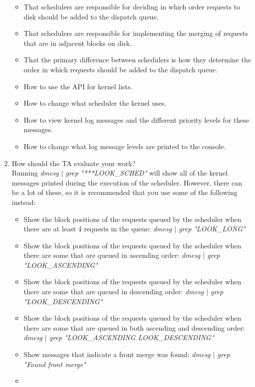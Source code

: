 \documentclass[onecolumn,draftclsnofoot, 10pt, compsoc]{IEEEtran}
\begin{document}
\begin{enumerate}
			\begin{itemize}
				\item
					That schedulers are responsible for deciding in which order requests to disk should be added to the dispatch queue.
				\item
					That schedulers are responsible for implementing the merging of requests that are in adjacent blocks on disk.
				\item 
					That the primary difference between schedulers is how they determine the order in which requests should be added to the dispatch queue.
				\item
					How to use the API for kernel lists.
				\item
					How to change what scheduler the kernel uses.
				\item
					How to view kernel log messages and the different priority levels for these messages.
				\item
					How to change what log message levels are printed to the console.
			\end{itemize}
		\item How should the TA evaluate your work? \\
			Running \textit{dmesg $|$ grep "***LOOK\_SCHED"} will show all of the kernel messages printed during the execution of the scheduler.
			However, there can be a lot of these, so it is recommended that you use some of the following instead:
			\begin{itemize}
				\item
					Show the block positions of the requests queued by the scheduler when there are at least 4 requests in the queue: \textit{dmesg $|$ grep "LOOK\_LONG"}
				\item 
					Show the block positions of the requests queued by the scheduler when there are some that are queued in ascending order: \textit{dmesg $|$ grep "LOOK\_ASCENDING"}
				\item 
					Show the block positions of the requests queued by the scheduler when there are some that are queued in descending order: \textit{dmesg $|$ grep "LOOK\_DESCENDING"}
				\item 
					Show the block positions of the requests queued by the scheduler when there are some that are queued in both ascending and descending order: \textit{dmesg $|$ grep "LOOK\_ASCENDING LOOK\_DESCENDING"}
				\item
					Show messages that indicate a front merge was found: \textit{dmesg $|$ grep "Found front merge"}
				\item 

\end{itemize}
\end{enumerate}
\end{document}

